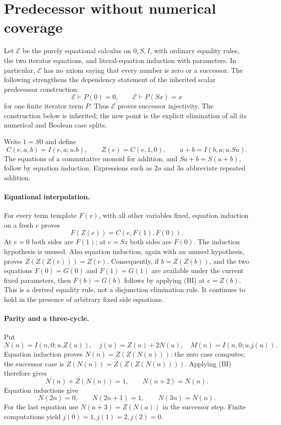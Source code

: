 \section{Predecessor without numerical coverage}
\label{sec:equational-predecessor}

Let $\mathcal E$ be the purely equational calculus on $0,S,I$, with
ordinary equality rules, the two iterator equations, and literal-equation
induction with parameters.  In particular, $\mathcal E$ has no axiom saying
that every number is zero or a successor.  The following strengthens the
dependency statement of the inherited scalar predecessor construction:
\[
  \mathcal E\vdash P(0)=0,
  \qquad \mathcal E\vdash P(Sx)=x
\]
for one finite iterator term $P$.  Thus $\mathcal E$ proves successor
injectivity.  The construction below is inherited; the new point is the
explicit elimination of all its numerical and Boolean case splits.

Write $1=S0$ and define
\[
 C(e,a,b)=I(e,a;u.b),\qquad Z(e)=C(e,1,0),\qquad
 a+b=I(b,a;u.Su).
\]
The equations of a commutative monoid for addition, and
$Sa+b=S(a+b)$, follow by equation induction.  Expressions such as $2a$ and
$3a$ abbreviate repeated addition.

\paragraph{Equational interpolation.}
For every term template $F(v)$, with all other variables fixed, equation
induction on a fresh $e$ proves
\begin{equation}
 F(Z(e))=C(e,F(1),F(0)). \tag{BI}
\end{equation}
At $e=0$ both sides are $F(1)$; at $e=Sz$ both sides are $F(0)$.
The induction hypothesis is unused.  Also equation induction, again with
an unused hypothesis, proves $Z(Z(Z(e)))=Z(e)$.
Consequently, if $b=Z(Z(b))$, and the two equations
$F(0)=G(0)$ and $F(1)=G(1)$ are available under the current fixed
parameters, then $F(b)=G(b)$ follows by applying (BI) at $e=Z(b)$.
This is a derived equality rule, not a disjunction elimination rule.  It
continues to hold in the presence of arbitrary fixed side equations.

\paragraph{Parity and a three-cycle.}
Put
\[
 N(n)=I(n,0;u.Z(u)),\quad j(u)=Z(u)+2N(u),\quad
 M(n)=I(n,0;u.j(u)).
\]
Equation induction proves $N(n)=Z(Z(N(n)))$: the zero case computes;
the successor case is $Z(N(n))=Z(Z(Z(N(n))))$.  Applying (BI) therefore
gives
\[
 N(n)+Z(N(n))=1,\qquad N(n+2)=N(n).
\]
Equation inductions give
\[
 N(2n)=0,\qquad N(2n+1)=1,\qquad N(3n)=N(n).
\]
For the last equation use $N(a+3)=Z(N(a))$ in the successor step.
Finite computations yield $j(0)=1,j(1)=2,j(2)=0$.

